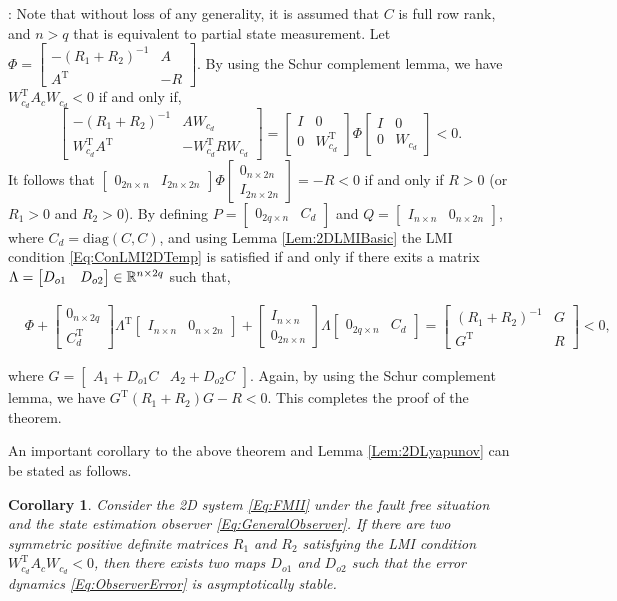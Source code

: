 \documentclass[journal,12pt,draftcls,onecolumn]{IEEEtran}
\newcommand{\tran}{\mathrm{T}}
\newcommand{\bbm}{\begin{bmatrix}}
\newcommand{\ebm}{\end{bmatrix}}
\newcommand{\bs}{\begin{small}}
\newcommand{\es}{\end{small}}
\newcommand{\diag}{\mathrm{diag}}
\def\QEDclosed{\hfill\IEEEQEDclosed}
\renewcommand{\qed}{\QEDclosed}
\renewenvironment{proof}[1][\proofname]{\noindent\nobreakspace{\bfseries #1}:\;}{\qed\par}
\newtheorem{corollary}{Corollary}
\begin{document}
\begin{proof}
	Note that  without loss of any generality, it is assumed that $C$ is full row rank, and $n>q$ that is equivalent to partial state measurement. Let $\Phi = \bbm -(R_1+R_2)^{-1}  &A \\ A^\tran &-R\ebm$. By using the Schur complement lemma, we have $W_{c_d}^\tran A_c W_{c_d}<0$ if and only if,
	\begin{equation}\label{Eq:ConLMI2DTemp}
		\bbm -(R_1+R_2)^{-1}  & A W_{c_d}\\ W_{c_d}^\tran A^\tran  &-W_{c_d}^\tran R W_{c_d}\ebm = \bbm I &0\\ 0 &W_{c_d}^\tran\ebm \Phi \bbm I &0\\ 0 &W_{c_d}\ebm<0.
	\end{equation}
	It follows that
	$\bbm 0_{2n\times n} &I_{2n\times 2n}\ebm \Phi \bbm 0_{n\times 2n} \\I_{2n\times 2n}\ebm = -R<0$ if and only if $R>0$ (or $R_1>0$ and $R_2>0$). By defining $P =\bbm 0_{2q\times n} &C_d\ebm$ and $Q =\bbm I_{n\times n} &0_{n\times 2n}\ebm$, where $C_d = \diag(C,C)$, and using Lemma \ref{Lem:2DLMIBasic} the LMI condition \eqref{Eq:ConLMI2DTemp} is satisfied if and only if there exits a matrix $\Lambda=\bbm D_{o1} &D_{o2}\ebm\in\fld{R}^{n\times 2q}$ such that,
	\bs
	\begin{equation}\label{Eq:ObserverDesignLMI_Gain}
		\begin{split}
			&\Phi + \bbm 0_{n\times 2q} \\ C_d^\tran\ebm \Lambda^\tran \bbm I_{n\times n} &0_{n\times 2n}\ebm +  \bbm I_{n\times n}\\0_{2n\times n}\ebm \Lambda \bbm 0_{2q\times n} &C_d\ebm  = \bbm (R_1+R_2)^{-1} &G\\ G^\tran &R\ebm <0,
		\end{split}
	\end{equation}
	\es
	where $G = \bbm A_1+D_{o1}C &A_2+D_{o2}C\ebm$. Again, by using the Schur complement lemma, we have
	$G^\tran (R_1+R_2)G-R<0$. This completes the proof of the theorem.
\end{proof}
An important corollary to the above theorem and Lemma \ref{Lem:2DLyapunov} can be stated as follows.
\begin{corollary}\label{Col:ObserverDesignLMI}
	Consider the 2D system \eqref{Eq:FMII} under the fault free situation and the state estimation observer \eqref{Eq:GeneralObserver}. If there are two symmetric positive definite matrices $R_1$ and $R_2$ satisfying the LMI condition $W_{c_d}^\tran A_c W_{c_d}<0$, then there exists two maps $D_{o1}$ and $D_{o2}$ such that the error dynamics \eqref{Eq:ObserverError} is asymptotically stable.
\end{corollary}
\end{document}
